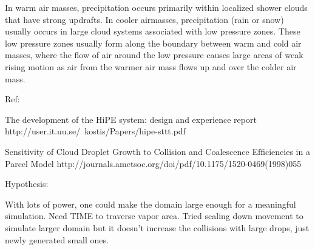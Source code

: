 \documentclass[twocolumn,a4paper,10pt]{article}
\begin{document}
In warm air masses, precipitation occurs primarily within localized shower
clouds that have strong updrafts. In cooler airmasses, precipitation (rain or
snow) usually occurs in large cloud systems associated with low pressure zones.
These low pressure zones usually form along the boundary between warm and cold
air masses, where the flow of air around the low pressure causes large areas of
weak rising motion as air from the warmer air mass flows up and over the colder
air mass.

Ref:

The development of the HiPE system:
design and experience report
http://user.it.uu.se/~kostis/Papers/hipe-sttt.pdf

Sensitivity of Cloud Droplet Growth to Collision and Coalescence Efﬁciencies in a
Parcel Model
http://journals.ametsoc.org/doi/pdf/10.1175/1520-0469(1998)055%

Hypothesis:

With lots of power, one could make the domain large enough for a meaningful simulation. Need TIME to traverse vapor area. Tried scaling down movement to simulate larger domain but it doesn’t increase the collisions  with large drops, just newly generated small ones.
\end{document}
